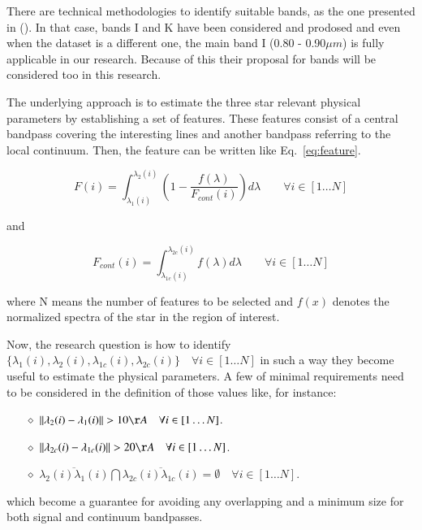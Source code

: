 {
There are technical methodologies to identify suitable bands, as the one 
presented in (\cite{2013A&A...549A.129C}). %
In that case, bands I and K have been considered and prodosed and 
even when the dataset is a different one, the main 
band I (0.80 - 0.90${\mu}m$) is fully 
applicable in our research. Because of this their proposal for bands 
will be considered too in this research.
}

{
The underlying approach is to estimate the three star relevant physical 
parameters by establishing a set of features. These features consist of
a central bandpass covering the interesting lines and another bandpass
referring to the local continuum. Then, the feature can be written like 
Eq.~\eqref{eq:feature}.

\begin{equation}\label{eq:feature}
  F(i) =  \int_{\lambda_{1}(i)}^{\lambda_{2}(i)} \left( 1 - \frac{f(\lambda)}{F_{cont}(i)}\right) d{\lambda}  \quad \quad \forall i \in [1 \ldots N]
\end{equation}

and 

\begin{equation}\label{eq:cont}
 F_{cont}(i) =  \int_{\lambda_{1c}(i)}^{\lambda_{2c}(i)} f(\lambda) d{\lambda}   \quad \quad \forall i \in [1 \ldots N]
\end{equation}

where N means the number of features to be selected and $f(x)$ denotes the normalized spectra of the star in the 
region of interest.
}

{
Now, the research question is how to identify 
$\{\lambda_{1}(i),\lambda_{2}(i), \lambda_{1c}(i),\lambda_{2c}(i)\}  \quad \forall i \in [1 \ldots N] $
in such a way they become useful to estimate the physical parameters.
A few of minimal requirements need to be considered in the definition of those values like, for instance:

\begin{itemize}
 \item[$\diamond$]{ $ \lVert \lambda_{2}(i) - \lambda_{1}(i) \rVert  > 10 \AA \quad \forall i \in [1 \ldots N]$.}
 \item[$\diamond$]{ $ \lVert \lambda_{2c}(i) - \lambda_{1c}(i) \rVert  > 20 \AA \quad \forall i \in [1 \ldots N]$.} 
 \item[$\diamond$]{ $ \overline{\lambda_{2}(i)\lambda_{1}(i)}  \bigcap 
                      \overline{\lambda_{2c}(i)\lambda_{1c}(i)} = \emptyset \quad \forall i \in [1 \ldots N]$.}
\end{itemize}

which become a guarantee for avoiding any overlapping and a minimum size for both signal and continuum bandpasses.
}

